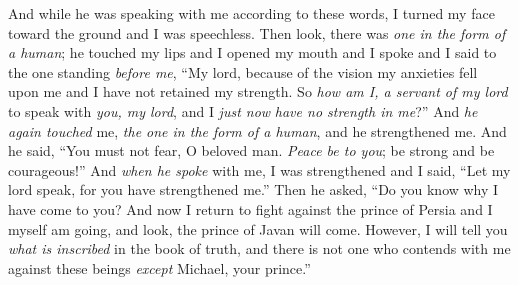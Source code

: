 \begin{biblechapter}
\verse And while he was speaking with me according to these words, I turned my face toward the ground and I was speechless.
\verse Then look, there was \textit{one in the form of a human}; he touched my lips and I opened my mouth and I spoke and I said to the one standing \textit{before me}, “My lord, because of the vision my anxieties fell upon me and I have not retained my strength.
\verse So \textit{how am I, a servant of my lord} to speak with \textit{you, my lord}, and I \textit{just now} \textit{have no strength in me}?”
\verse And \textit{he again touched} me, \textit{the one in the form of a human}, and he strengthened me.
\verse And he said, “You must not fear, O beloved man. \textit{Peace be to you}; be strong and be courageous!” And \textit{when he spoke} with me, I was strengthened and I said, “Let my lord speak, for you have strengthened me.”
\verse Then he asked, “Do you know why I have come to you? And now I return to fight against the prince of Persia and I myself am going, and look, the prince of Javan will come.
\verse However, I will tell you \textit{what is inscribed} in the book of truth, and there is not one who contends with me against these beings \textit{except} Michael, your prince.”
\end{biblechapter}

